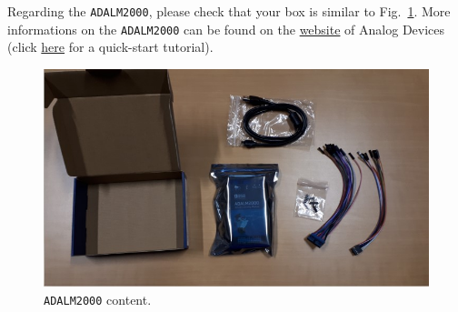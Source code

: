 
Regarding the \texttt{ADALM2000}, please check that your box is similar to Fig.~\ref{fig:adalm}. More informations on the \texttt{ADALM2000} can be found on the \href{https://www.analog.com/en/design-center/evaluation-hardware-and-software/evaluation-boards-kits/ADALM2000.html#eb-overview}{website} of Analog Devices (click \href{https://wiki.analog.com/university/tools/m2k/users}{here} for a quick-start tutorial).

\begin{figure}[h!]
    \centering
    \includegraphics[width=1\textwidth]{figs/adalm.png}
    \caption{\texttt{ADALM2000} content.}
    \label{fig:adalm}
\end{figure}
